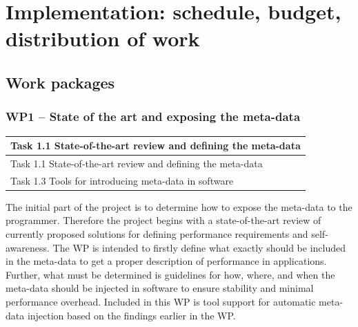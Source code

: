 \documentclass{article}
\begin{document}
\section{Implementation: schedule, budget, distribution of work}
\subsection{Work packages}
\subsubsection{WP1 -- State of the art and exposing the meta-data}
\begin{table}
\vspace{-0.5cm}
\small
\begin{tabular}{ | l |}
\hline
{Task 1.1 State-of-the-art review and defining the meta-data}  \\ \hline
{Task 1.1 State-of-the-art review and defining the meta-data}  \\ \hline
{Task 1.3 Tools for introducing meta-data in software}		\\ \hline
\end{tabular}
\vspace{-0.3cm}
\end{table}
The initial part of the project is to determine how to expose the meta-data to the programmer.
Therefore the project begins with a state-of-the-art review of currently proposed solutions for defining performance requirements and self-awareness.
The WP is intended to firstly define what exactly should be included in the meta-data to get a proper description of performance in applications. 
Further, what must be determined is guidelines for how, where, and when the meta-data should be injected in software to ensure stability and minimal performance overhead.
Included in this WP is tool support for automatic meta-data injection based on the findings earlier in the WP.
\end{document}
